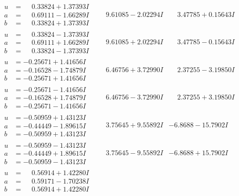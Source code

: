 \documentclass[1p]{elsarticle_modified}
\theoremstyle{definition}
\begin{document}
$$\begin{array}{c|c|c}
\begin{aligned}
u &= \phantom{-}0.33824 + 1.37393 I \\
a &= \phantom{-}0.69111 - 1.66289 I \\
b &= \phantom{-}0.33824 + 1.37393 I\end{aligned}
 & \phantom{-}9.61085 - 2.02294 I & \phantom{-}3.47785 + 0.15643 I \\ \hline\begin{aligned}
u &= \phantom{-}0.33824 - 1.37393 I \\
a &= \phantom{-}0.69111 + 1.66289 I \\
b &= \phantom{-}0.33824 - 1.37393 I\end{aligned}
 & \phantom{-}9.61085 + 2.02294 I & \phantom{-}3.47785 - 0.15643 I \\ \hline\begin{aligned}
u &= -0.25671 + 1.41656 I \\
a &= -0.16528 - 1.74879 I \\
b &= -0.25671 + 1.41656 I\end{aligned}
 & \phantom{-}6.46756 + 3.72990 I & \phantom{-}2.37255 - 3.19850 I \\ \hline\begin{aligned}
u &= -0.25671 - 1.41656 I \\
a &= -0.16528 + 1.74879 I \\
b &= -0.25671 - 1.41656 I\end{aligned}
 & \phantom{-}6.46756 - 3.72990 I & \phantom{-}2.37255 + 3.19850 I \\ \hline\begin{aligned}
u &= -0.50959 + 1.43123 I \\
a &= -0.44449 - 1.89615 I \\
b &= -0.50959 + 1.43123 I\end{aligned}
 & \phantom{-}3.75645 + 9.55892 I & -6.8688 - 15.7902 I \\ \hline\begin{aligned}
u &= -0.50959 - 1.43123 I \\
a &= -0.44449 + 1.89615 I \\
b &= -0.50959 - 1.43123 I\end{aligned}
 & \phantom{-}3.75645 - 9.55892 I & -6.8688 + 15.7902 I \\ \hline\begin{aligned}
u &= \phantom{-}0.56914 + 1.42280 I \\
a &= \phantom{-}0.59171 - 1.70238 I \\
b &= \phantom{-}0.56914 + 1.42280 I\end{aligned}

\end{array}$$
\end{document}
